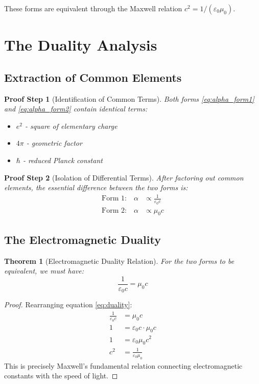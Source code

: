 \documentclass[12pt,a4paper]{article}
\newcommand{\alphaem}{\alpha}
\newtheorem{theorem}{Theorem}[section]
\newtheorem{proof_step}{Proof Step}[section]
\begin{document}
	These forms are equivalent through the Maxwell relation $c^2 = 1/(\varepsilon_0\mu_0)$.
	
	\section{The Duality Analysis}
	
	\subsection{Extraction of Common Elements}
	
	\begin{proof_step}[Identification of Common Terms]
		Both forms \eqref{eq:alpha_form1} and \eqref{eq:alpha_form2} contain identical terms:
		\begin{itemize}
			\item $e^2$ - square of elementary charge
			\item $4\pi$ - geometric factor
			\item $\hbar$ - reduced Planck constant
		\end{itemize}
	\end{proof_step}
	
	\begin{proof_step}[Isolation of Differential Terms]
		After factoring out common elements, the essential difference between the two forms is:
		\begin{align}
			\text{Form 1:} \quad \alphaem &\propto \frac{1}{\varepsilon_0 c} \label{eq:diff1}\\
			\text{Form 2:} \quad \alphaem &\propto \mu_0 c \label{eq:diff2}
		\end{align}
	\end{proof_step}
	
	\subsection{The Electromagnetic Duality}
	
	\begin{theorem}[Electromagnetic Duality Relation]
		For the two forms to be equivalent, we must have:
		\begin{equation}
			\frac{1}{\varepsilon_0 c} = \mu_0 c \label{eq:duality}
		\end{equation}
	\end{theorem}
	
	\begin{proof}
		Rearranging equation \eqref{eq:duality}:
		\begin{align}
			\frac{1}{\varepsilon_0 c} &= \mu_0 c\\
			1 &= \varepsilon_0 c \cdot \mu_0 c\\
			1 &= \varepsilon_0 \mu_0 c^2\\
			c^2 &= \frac{1}{\varepsilon_0 \mu_0}
		\end{align}
		This is precisely Maxwell's fundamental relation connecting electromagnetic constants with the speed of light.
	\end{proof}
	
\end{document}

